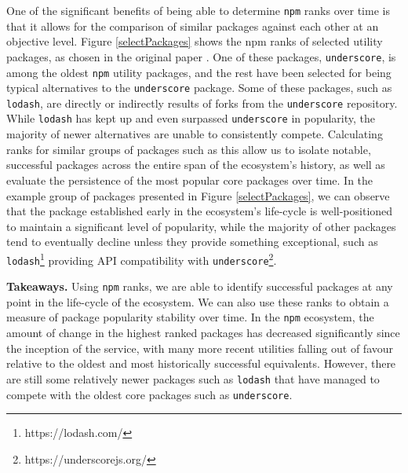 \documentclass[10pt,conference]{IEEEtran}
\def\code#1{\texttt{#1}}
\begin{document}
One of the significant benefits of being able to determine
\code{npm} ranks over time is that it allows for the comparison
of similar packages against each other at an objective level.
Figure \ref{selectPackages} shows the npm ranks of selected 
utility packages, as chosen in the original paper \cite{Wittern:2016}.
One of these packages, \code{underscore}, is among the oldest \code{npm} 
utility packages, and the rest have been selected for being
typical alternatives to the \code{underscore} package. Some of these packages,
such as \code{lodash}, are directly or indirectly results of forks from the
\code{underscore} repository. While \code{lodash} has kept up and even surpassed
\code{underscore} in popularity, the majority of newer alternatives are unable
to consistently compete. Calculating ranks for similar groups of packages such as
this allow us to isolate notable, successful packages across the entire span of
the ecosystem's history, as well as evaluate the persistence of the most popular
core packages over time. In the example group of packages presented in Figure \ref{selectPackages},
we can observe that the package established early in the ecosystem's life-cycle
is well-positioned to maintain a significant level of popularity, while the majority of
other packages tend to eventually decline unless they provide something exceptional,
such as \code{lodash}\footnote{https://lodash.com/} providing API compatibility with \code{underscore}\footnote{https://underscorejs.org/}.

\textbf{Takeaways.} Using \code{npm} ranks, we are able to identify successful packages 
at any point in the life-cycle of the ecosystem. We can also use these
ranks to obtain a measure of package popularity stability over time. In 
the \code{npm} ecosystem, the amount of change in the highest ranked packages
has decreased significantly since the inception of the service, with many
more recent utilities falling out of favour relative to the oldest and most
historically successful equivalents. However, there are still some relatively newer 
packages such as \code{lodash} that have managed to compete with the oldest core packages
such as \code{underscore}.

\end{document}
